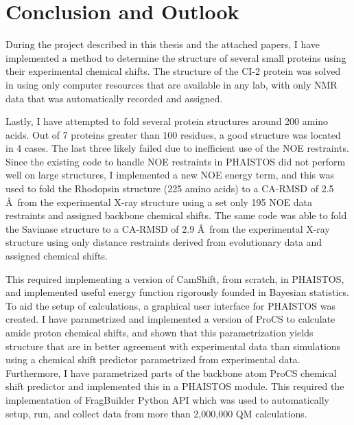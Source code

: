 \chapter{Conclusion and Outlook}

During the project described in this thesis and the attached papers, I have implemented a method to determine the structure of several small proteins using their experimental chemical shifts.
The structure of the CI-2 protein was solved in using only computer resources that are available in any lab, with only NMR data that was automatically recorded and assigned.

Lastly, I have attempted to fold several protein structures around 200 amino acids.
Out of 7 proteins greater than 100 residues, a good structure was located in 4 cases.
The last three likely failed due to inefficient use of the NOE restraints.
Since the existing code to handle NOE restraints in PHAISTOS did not perform well on large structures, I implemented a new NOE energy term, and this was used to fold the Rhodopsin structure (225 amino acids) to a CA-RMSD of 2.5 \AA~from the experimental X-ray structure using a set only 195 NOE data restraints and assigned backbone chemical shifts.
The same code was able to fold the Savinase structure to a CA-RMSD of 2.9 \AA~from the experimental X-ray structure using only distance restraints derived from evolutionary data and assigned chemical shifts.

This required implementing a version of CamShift, from scratch, in PHAISTOS, and implemented useful energy function rigorously founded in Bayesian statistics.
To aid the setup of calculations, a graphical user interface for PHAISTOS was created.
I have parametrized and implemented a version of ProCS to calculate amide proton chemical shifts, and shown that this parametrization yields structure that are in better agreement with experimental data than simulations using a chemical shift predictor parametrized from experimental data.
Furthermore, I have parametrized parts of the backbone atom ProCS chemical shift predictor and implemented this in a PHAISTOS module.
This required the implementation of FragBuilder Python API which was used to automatically setup, run, and collect data from more than 2,000,000 QM calculations.
